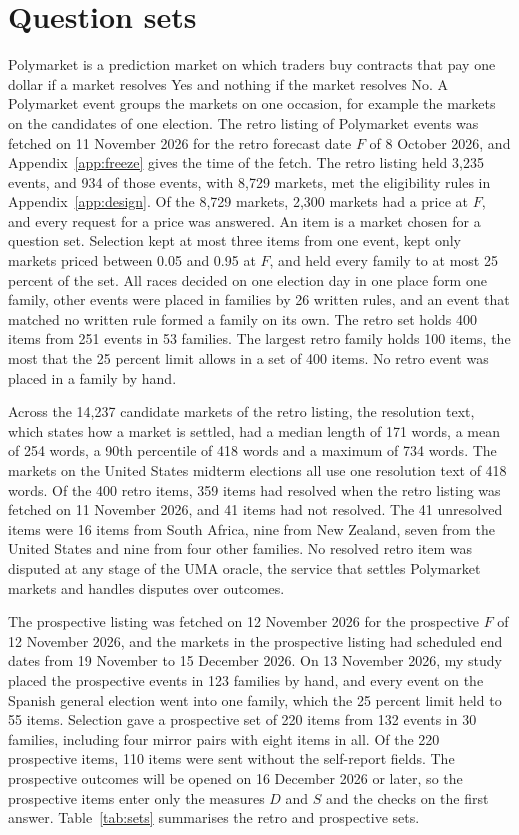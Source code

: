 \documentclass[11pt]{article}
\begin{document}
\section{Question sets}\label{app:sets}

Polymarket is a prediction market on which traders buy contracts that pay one dollar if a market resolves Yes and nothing if the market resolves No. A Polymarket event groups the markets on one occasion, for example the markets on the candidates of one election. The retro listing of Polymarket events was fetched on 11 November 2026 for the retro forecast date $F$ of 8 October 2026, and Appendix~\ref{app:freeze} gives the time of the fetch. The retro listing held 3,235 events, and 934 of those events, with 8,729 markets, met the eligibility rules in Appendix~\ref{app:design}. Of the 8,729 markets, 2,300 markets had a price at $F$, and every request for a price was answered. An item is a market chosen for a question set. Selection kept at most three items from one event, kept only markets priced between 0.05 and 0.95 at $F$, and held every family to at most 25 percent of the set. All races decided on one election day in one place form one family, other events were placed in families by 26 written rules, and an event that matched no written rule formed a family on its own. The retro set holds 400 items from 251 events in 53 families. The largest retro family holds 100 items, the most that the 25 percent limit allows in a set of 400 items. No retro event was placed in a family by hand.

Across the 14,237 candidate markets of the retro listing, the resolution text, which states how a market is settled, had a median length of 171 words, a mean of 254 words, a 90th percentile of 418 words and a maximum of 734 words. The markets on the United States midterm elections all use one resolution text of 418 words. Of the 400 retro items, 359 items had resolved when the retro listing was fetched on 11 November 2026, and 41 items had not resolved. The 41 unresolved items were 16 items from South Africa, nine from New Zealand, seven from the United States and nine from four other families. No resolved retro item was disputed at any stage of the UMA oracle, the service that settles Polymarket markets and handles disputes over outcomes.

The prospective listing was fetched on 12 November 2026 for the prospective $F$ of 12 November 2026, and the markets in the prospective listing had scheduled end dates from 19 November to 15 December 2026. On 13 November 2026, my study placed the prospective events in 123 families by hand, and every event on the Spanish general election went into one family, which the 25 percent limit held to 55 items. Selection gave a prospective set of 220 items from 132 events in 30 families, including four mirror pairs with eight items in all. Of the 220 prospective items, 110 items were sent without the self-report fields. The prospective outcomes will be opened on 16 December 2026 or later, so the prospective items enter only the measures $D$ and $S$ and the checks on the first answer. Table~\ref{tab:sets} summarises the retro and prospective sets.
\end{document}
